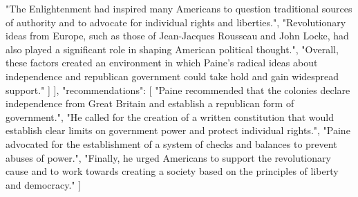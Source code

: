 \documentclass{article}
\begin{document}
\begin{tcolorbox}[colframe=black,colback=white]
{{        "The Enlightenment had inspired many Americans to question traditional sources of authority and to advocate for individual rights and liberties.",
        "Revolutionary ideas from Europe, such as those of Jean-Jacques Rousseau and John Locke, had also played a significant role in shaping American political thought.",
        "Overall, these factors created an environment in which Paine's radical ideas about independence and republican government could take hold and gain widespread support."
      ]
    }
  ],
  "recommendations": [
    "Paine recommended that the colonies declare independence from Great Britain and establish a republican form of government.",
    "He called for the creation of a written constitution that would establish clear limits on government power and protect individual rights.",
    "Paine advocated for the establishment of a system of checks and balances to prevent abuses of power.",
    "Finally, he urged Americans to support the revolutionary cause and to work towards creating a society based on the principles of liberty and democracy."
  ]
}


\end{tcolorbox}
\end{document}
